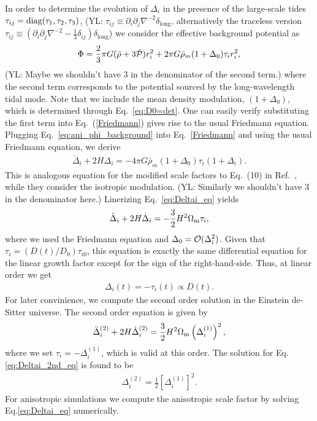 \documentclass[a4paper,11pt]{article}
\newcommand{\YL}[1]{\textcolor{Bittersweet}{(YL: #1)}}
\begin{document}
In order to determine the evolution of $\Delta_i$ in the presence of the large-scale tides $\tau_{ij}={\rm diag}(\tau_1,\tau_2,\tau_3)$,
\YL{$\tau_{ij} \equiv \partial_i \partial_j \nabla^{-2} \delta_\mathrm{long}$, alternatively the traceless version
$\tau_{ij} \equiv (\partial_i \partial_j \nabla^{-2} - \frac13\delta_{ij}) \delta_\mathrm{long}$}
we consider the effective background potential as
\begin{align}
    \Phi = \frac{2}{3}\pi G(\bar{\rho}+3\bar{\cal P}) r_i^2
            +2 \pi G\bar{\rho}_m(1+\Delta_0)\tau_i r_i^2,
            \label{eq:ani_phi_background}
\end{align}
\YL{Maybe we shouldn't have 3 in the denominator of the second term.}
where the second term corresponds to the potential sourced by the long-wavelength tidal mode.
Note that we include the mean density modulation, $(1+\Delta_0)$,
which is determined through Eq.~\eqref{eq:D0=det}.
One can easily verify substituting the first term into Eq.~(\ref{Friedmann})
gives rise to the usual Friedmann equation.
Plugging Eq.~\eqref{eq:ani_phi_background} into Eq.~\eqref{Friedmann}
and using the usual Friedmann equation,
we derive
\begin{align}
    \ddot \Delta_i + 2H\dot \Delta_i
    = -4\pi G \bar{\rho}_m (1+\Delta_0)\tau_i (1+\Delta_i).
    \label{eq:Deltai_eq}
\end{align}
This is analogous equation for the modified scale factors to Eq.~(10) in Ref.~\cite{Wagner_etal:2014},
while they consider the isotropic modulation.
\YL{Similarly we shouldn't have 3 in the denominator here.}
Linerizing Eq.~\eqref{eq:Deltai_eq} yields
\begin{align}
 \ddot \Delta_i + 2H\dot \Delta_i
 = -\frac{3}{2}H^2\Omega_{\rm m}\tau_i,
\end{align}
where we used the Friedmann equation and $\Delta_0 = {\cal O}(\Delta_i^2)$.
Given that $\tau_i = (D(t)/D_0)\tau_{i0}$,
this equation is exactly the same differential equation for the linear growth factor
except for the sign of the right-hand-side.
Thus, at linear order we get
\begin{align}
\Delta_i(t) = -\tau_i(t) \propto D(t).
\end{align}
For later convinience, we compute the second order solution in the Einstein de-Sitter universe.
The second order equation is given by
\begin{align}
 \ddot \Delta^{(2)}_i + 2H\dot \Delta^{(2)}_i
 = \frac{3}{2}H^2\Omega_{\rm m}\left(\Delta^{(1)}_i\right)^2,
 \label{eq:Deltai_2nd_eq}
\end{align}
where we set $\tau_i = -\Delta_i^{(1)} $, which is valid at this order.
The solution for Eq.\eqref{eq:Deltai_2nd_eq} is found to be
\begin{align}
\Delta_i^{(2)} = \frac{1}{2}\left[ \Delta_i^{(1)} \right]^2.
\end{align}
For anisotropic simulations we compute the anisotropic scale factor
by solving Eq.\eqref{eq:Deltai_eq} numerically.
\end{document}
